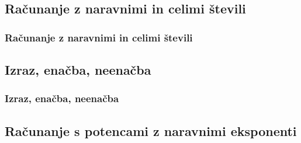         \begin{frame}

        \end{frame}


    \subsection{Računanje z naravnimi in celimi števili}

        \begin{frame}
            \frametitle{Računanje z naravnimi in celimi števili}
        \end{frame}

    \subsection{Izraz, enačba, neenačba}

        \begin{frame}
            \frametitle{Izraz, enačba, neenačba}
        \end{frame}





    \subsection{Računanje s potencami z naravnimi eksponenti}

